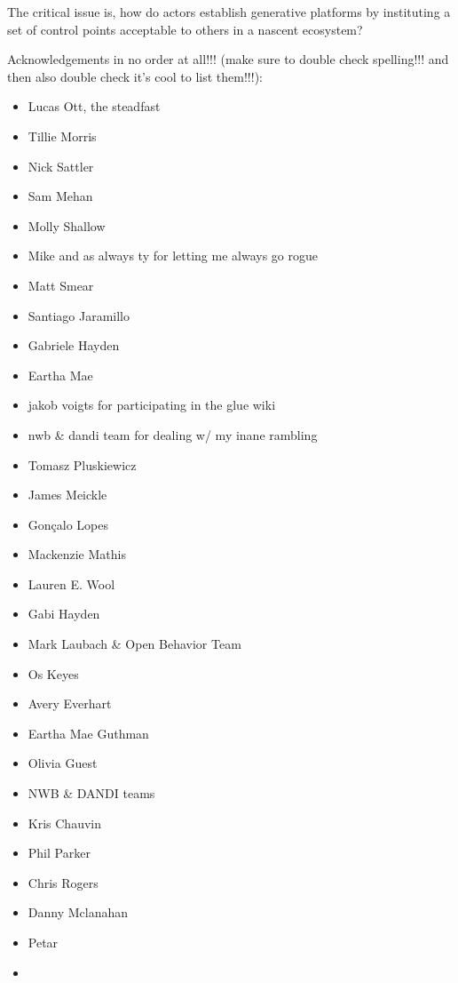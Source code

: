 \documentclass[10pt]{article}
\begin{document}
\begin{leftbar}
The critical issue is, how do actors establish generative platforms by
instituting a set of control points acceptable to others in a nascent
ecosystem? \cite{tilsonDigitalInfrastructuresMissing2010} 
\end{leftbar}

Acknowledgements in no order at all!!! (make sure to double check
spelling!!! and then also double check it's cool to list them!!!):

\begin{itemize}

\item
  Lucas Ott, the steadfast
\item
  Tillie Morris
\item
  Nick Sattler
\item
  Sam Mehan
\item
  Molly Shallow
\item
  Mike and as always ty for letting me always go rogue
\item
  Matt Smear
\item
  Santiago Jaramillo
\item
  Gabriele Hayden
\item
  Eartha Mae
\item
  jakob voigts for participating in the glue wiki
\item
  nwb \& dandi team for dealing w/ my inane rambling
\item
  Tomasz Pluskiewicz
\item
  James Meickle
\item
  Gonçalo Lopes
\item
  Mackenzie Mathis
\item
  Lauren E. Wool
\item
  Gabi Hayden
\item
  Mark Laubach \& Open Behavior Team
\item
  Os Keyes
\item
  Avery Everhart
\item
  Eartha Mae Guthman
\item
  Olivia Guest
\item
  NWB \& DANDI teams
\item
  Kris Chauvin
\item
  Phil Parker
\item
  Chris Rogers
\item
  Danny Mclanahan
\item
  Petar
\item

\end{itemize}
\end{document}
